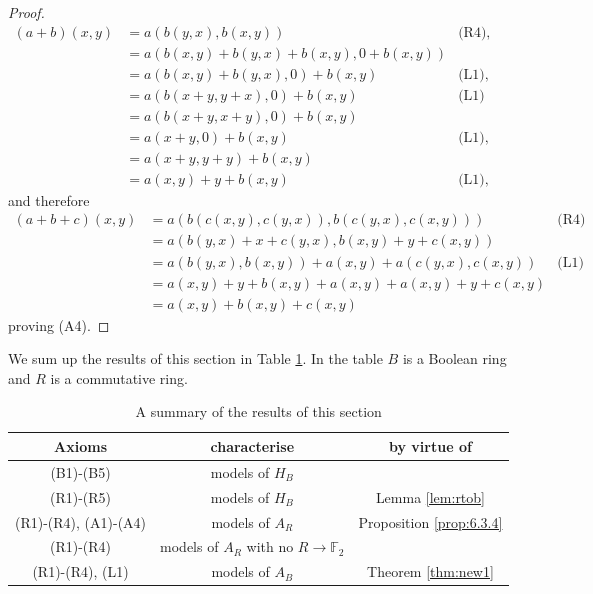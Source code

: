 \documentclass{amsart}
\numberwithin{equation}{section}
\theoremstyle{plain}
\theoremstyle{definition}
\begin{document}
\begin{proof}
\begin{align*}
    (a+b)(x,y) & = a(b(y,x),b(x,y)) & \text{(R4),(B3)} \\
    & = a(b(x,y)+b(y,x)+b(x,y),0+b(x,y)) & \\
    & = a(b(x,y)+b(y,x),0) + b(x,y) & \text{(L1),(R1)} \\
    & = a(b(x+y,y+x),0) + b(x,y) & \text{(L1)} \\
    & = a(b(x+y,x+y),0) + b(x,y) & \\
    & = a(x+y,0)+b(x,y) & \text{(L1),(R1)} \\
    & = a(x+y,y+y)+b(x,y) & \\
    & = a(x,y) + y + b(x,y) & \text{(L1),(R1)}
  \end{align*}
  and therefore 
  \begin{align*}
    (a+b+c)(x,y) & = a(b(c(x,y),c(y,x)),b(c(y,x),c(x,y))) & \text{(R4)} \\
    & = a(b(y,x)+x +c(y,x),b(x,y)+y+c(x,y)) & \\
    & = a(b(y,x),b(x,y)) +a(x,y) + a(c(y,x),c(x,y)) & \text{(L1)}\\
    & = a(x,y)+y+b(x,y) +a(x,y)+a(x,y)+y+c(x,y) & \\
    & = a(x,y) + b(x,y)+c(x,y) & 
  \end{align*}
  proving (A4). 
\end{proof}

We sum up the results of this section in Table \ref{tab:axioms}.
In the table $B$ is a Boolean ring and $R$ is a commutative ring. 

\begin{table}%
  \caption{A summary of the results of this section}
    \label{tab:axioms}
\centering
\begin{tabular}{c c c}
\toprule
\textbf{Axioms} & \textbf{characterise} & \textbf{by virtue of}\\
\midrule
(B1)-(B5)  & models of $H_B$ & \cite[Proposition 3.16]{G24} \\
\midrule
(R1)-(R5)  & models of $H_B$ & Lemma \ref{lem:rtob} \\
\midrule 
(R1)-(R4), (A1)-(A4)  & models of $A_R$ & Proposition \ref{prop:6.3.4} \\
\midrule 
(R1)-(R4)  & models of $A_R$ with no $R \to \mathbb{F}_2$ & \cite{S77,IKS78} \\
\midrule 
(R1)-(R4), (L1) & models of $A_B$ & Theorem \ref{thm:new1} \\
\bottomrule
\end{tabular}
\end{table}
\end{document}
